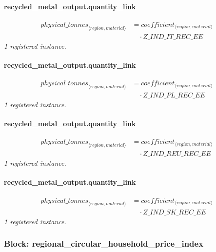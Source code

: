 \documentclass[11pt]{article}
\begin{document}
\paragraph{recycled\_metal\_output.quantity\_link}
\begin{align*}
{physical\_tonnes}_{\langle region, material\rangle} &= coefficient_{\langle region, material\rangle}\\
&\quad {}\cdot Z\_IND\_IT\_REC\_EE
\end{align*}
\noindent\emph{1 registered instance.}\par
\paragraph{recycled\_metal\_output.quantity\_link}
\begin{align*}
{physical\_tonnes}_{\langle region, material\rangle} &= coefficient_{\langle region, material\rangle}\\
&\quad {}\cdot Z\_IND\_PL\_REC\_EE
\end{align*}
\noindent\emph{1 registered instance.}\par
\paragraph{recycled\_metal\_output.quantity\_link}
\begin{align*}
{physical\_tonnes}_{\langle region, material\rangle} &= coefficient_{\langle region, material\rangle}\\
&\quad {}\cdot Z\_IND\_REU\_REC\_EE
\end{align*}
\noindent\emph{1 registered instance.}\par
\paragraph{recycled\_metal\_output.quantity\_link}
\begin{align*}
{physical\_tonnes}_{\langle region, material\rangle} &= coefficient_{\langle region, material\rangle}\\
&\quad {}\cdot Z\_IND\_SK\_REC\_EE
\end{align*}
\noindent\emph{1 registered instance.}\par
\subsubsection*{Block: regional\_circular\_household\_price\_index}
\end{document}

